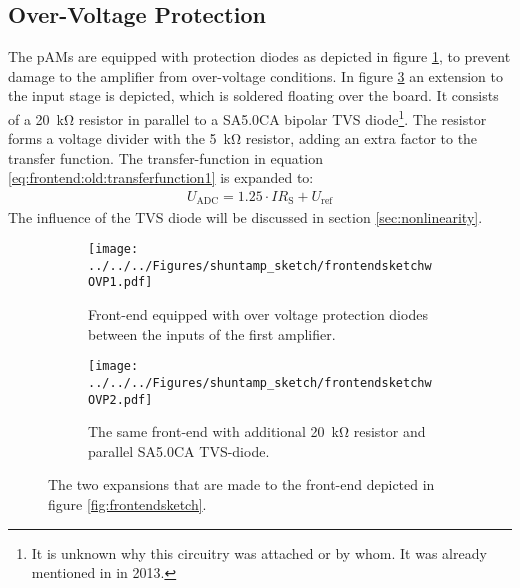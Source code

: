 \subsection*{Over-Voltage Protection}
\label{sec:status:ovp}
The \acp{pAM} are equipped with protection diodes as depicted in figure \ref{fig:frontend:old:ovp1}, to prevent damage to the amplifier from over-voltage conditions. In figure \ref{fig:frontend:old:ovp2} an extension to the input stage is depicted, which is soldered floating over the board. It consists of a \SI{20}{\kilo\ohm} resistor in parallel to a SA5.0CA bipolar TVS diode\footnote{It is unknown why this circuitry was attached or by whom. It was already mentioned in \cite{bugl} in 2013.}. The resistor forms a voltage divider with the \SI{5}{\kilo\ohm} resistor, adding an extra factor to the transfer function. The transfer-function in equation \ref{eq:frontend:old:transferfunction1} is expanded to:
\begin{align}
U_\text{ADC}=1.25\cdot IR_\text{S}+U_\text{ref}
\label{eq:frontend:old:transferfunction2}
\end{align}
The influence of the TVS diode will be discussed in section \ref{sec:nonlinearity}.
\begin{figure}
	\begin{subfigure}{\textwidth}
		\centering
		\texttt{[image: ../../../Figures/shuntamp\_sketch/frontendsketchwOVP1.pdf]}
		\caption{Front-end equipped with over voltage protection diodes between the inputs of the first amplifier.}
		\label{fig:frontend:old:ovp1}
	\end{subfigure}\hfill
	\begin{subfigure}{\textwidth}
		\centering
		\texttt{[image: ../../../Figures/shuntamp\_sketch/frontendsketchwOVP2.pdf]}
		\caption{The same front-end with additional \SI{20}{\kilo\ohm} resistor and parallel SA5.0CA TVS-diode.}
		\label{fig:frontend:old:ovp2}
	\end{subfigure}
	\caption{The two expansions that are made to the front-end depicted in figure \ref{fig:frontendsketch}.}
\end{figure}
